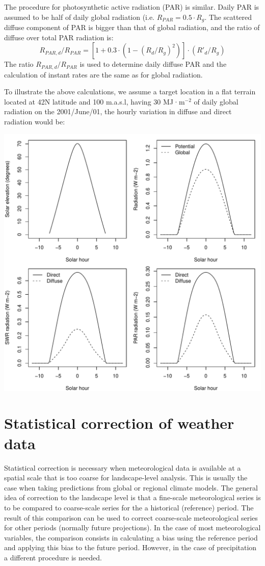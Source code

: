 \documentclass[11pt,a4paper]{article}
\begin{document}
The procedure for photosynthetic active radiation (PAR) is similar. Daily PAR is assumed to be half of daily global radiation (i.e. $R_{PAR} = 0.5 \cdot R_{g}$. The scattered diffuse component of PAR is bigger than that of global radiation, and the ratio of diffuse over total PAR radiation is:
\begin{equation}
R_{PAR,d}/R_{PAR} = \left[1+0.3 \cdot (1- (R_{d}/R_{g})^2)\right]\cdot  (R'_{d}/R_{g})
\end{equation}
The ratio $R_{PAR,d}/R_{PAR}$ is used to determine daily diffuse PAR and the calculation of instant rates are the same as for global radiation.

To illustrate the above calculations, we assume a target location in a flat terrain located at 42N latitude and 100 m.a.s.l, having 30 MJ·m$^{-2}$ of daily global radiation on the 2001/June/01, the hourly variation in diffuse and direct radiation would be:
\begin{center}
\includegraphics{Meteorology-017}
\end{center}
\section{Statistical correction of weather data}
Statistical correction is necessary when meteorological data is available at a spatial scale that is too coarse for landscape-level analysis. This is usually the case when taking predictions from global or regional climate models. The general idea of correction to the landscape level is that a fine-scale meteorological series is to be compared to coarse-scale series for the a historical (reference) period. The result of this comparison can be used to correct coarse-scale meteorological series for other periods (normally future projections). In the case of most meteorological variables, the comparison consists in calculating a bias using the reference period and applying this bias to the future period. However, in the case of precipitation a different procedure is needed.
\end{document}

